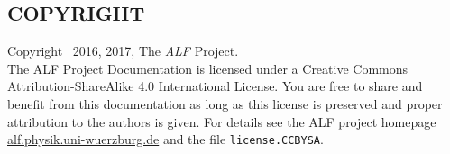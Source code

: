 \documentclass{SciPost}
\begin{document}
\begin{appendix}
\subsection*{COPYRIGHT}
%
Copyright \textcopyright ~2016, 2017, The \textit{ALF} Project.\\
The ALF Project Documentation 
is licensed under a Creative Commons Attribution-ShareAlike 4.0 International License.
You are free to share and benefit from this documentation as long as this license is preserved
and proper attribution to the authors is given. For details see the ALF project
homepage \url{alf.physik.uni-wuerzburg.de} and the file \texttt{license.CCBYSA}.
\end{appendix}




\clearpage




\nolinenumbers
\end{document}
